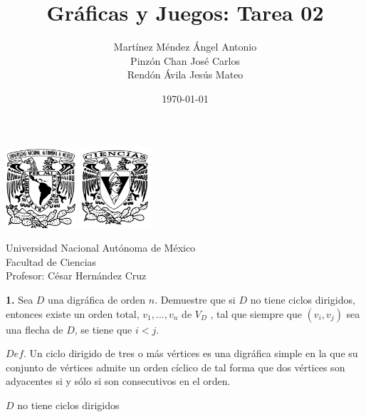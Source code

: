 \documentclass[12pt]{article}
\title{\textbf{Gráficas y Juegos: Tarea 02}}
\author{Martínez Méndez Ángel Antonio\\Pinzón Chan José Carlos\\Rendón Ávila Jesús Mateo}
\date{\today}
\begin{document}
\maketitle
\begin{center}
\vspace{3cm}
\includegraphics[width=0.195\textwidth]{Escudo.png}
\hspace{0.5cm}
\includegraphics[width=0.2\textwidth]{logo_ciencias.png}
\end{center}
\begin{center}
    \vspace{1cm}
    Universidad Nacional Autónoma de México\\
    Facultad de Ciencias\\
    Profesor: César Hernández Cruz\\
\end{center}

\newpage

%
%
\textbf{1.} Sea $D$ una digráfica de orden $n$. Demuestre que si $D$ no tiene ciclos dirigidos,
entonces existe un orden total, $v_1 , . . . , v_n$ de $V_D$ , tal que siempre que $(v_i , v_j)$ sea
una flecha de $D$, se tiene que $i < j$.

\begin{tcolorbox}[title=\textbf{Definiciones}, colback=blue!15!white, colframe=black!, breakable]
    $Def$. Un ciclo dirigido de tres o más vértices es una digráfica simple en la que su conjunto
    de vértices admite un orden cíclico de tal forma que dos vértices son adyacentes si y
    sólo si son consecutivos en el orden.
\end{tcolorbox}

\begin{tcolorbox}[title=\textbf{Hipotesis}, colback=red!15!white, colframe=black!, breakable]
    $D$ no tiene ciclos dirigidos
\end{tcolorbox}
\end{document}
